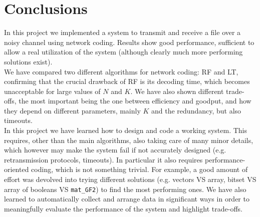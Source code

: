 \section{Conclusions}\label{sec:concl}
In this project we implemented a system to transmit and receive a file over a noisy channel using network coding. Results show good performance, sufficient to allow a real utilization of the system (although clearly much more performing solutions exist).\\
We have compared two different algorithms for network coding: RF and LT, confirming that the crucial drawback of RF is its decoding time, which becomes unacceptable for large values of $N$ and $K$. We have also shown different trade-offs, the most important being the one between efficiency and goodput, and how they depend on different parameters, mainly $K$ and the redundancy, but also timeouts.\\
In this project we have learned how to design and code a working system. This requires, other than the main algorithms, also taking care of many minor details, which however may make the system fail if not accurately designed (e.g. retransmission protocols, timeouts). In particular it also requires performance-oriented coding, which is not something trivial. For example, a good amount of effort was devolved into trying different solutions (e.g. vectors VS array, bitset VS array of booleans VS \texttt{mat\_GF2}) to find the most performing ones. We have also learned to automatically collect and arrange data in significant ways in order to meaningfully evaluate the performance of the system and highlight trade-offs.

